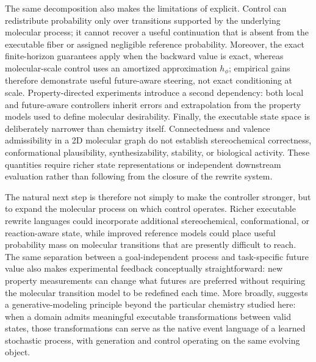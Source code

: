 The same decomposition also makes the limitations of \method{} explicit. Control can redistribute probability only over transitions supported by the underlying molecular process; it cannot recover a useful continuation that is absent from the executable fiber or assigned negligible reference probability. Moreover, the exact finite-horizon guarantees apply when the backward value is exact, whereas molecular-scale control uses an amortized approximation $h_\phi$; empirical gains therefore demonstrate useful future-aware steering, not exact conditioning at scale. Property-directed experiments introduce a second dependency: both local and future-aware controllers inherit errors and extrapolation from the property models used to define molecular desirability. Finally, the executable state space is deliberately narrower than chemistry itself. Connectedness and valence admissibility in a 2D molecular graph do not establish stereochemical correctness, conformational plausibility, synthesizability, stability, or biological activity. These quantities require richer state representations or independent downstream evaluation rather than following from the closure of the rewrite system.

The natural next step is therefore not simply to make the controller stronger, but to expand the molecular process on which control operates. Richer executable rewrite languages could incorporate additional stereochemical, conformational, or reaction-aware state, while improved reference models could place useful probability mass on molecular transitions that are presently difficult to reach. The same separation between a goal-independent process and task-specific future value also makes experimental feedback conceptually straightforward: new property measurements can change what futures are preferred without requiring the molecular transition model to be redefined each time. More broadly, \method{} suggests a generative-modeling principle beyond the particular chemistry studied here: when a domain admits meaningful executable transformations between valid states, those transformations can serve as the native event language of a learned stochastic process, with generation and control operating on the same evolving object.
